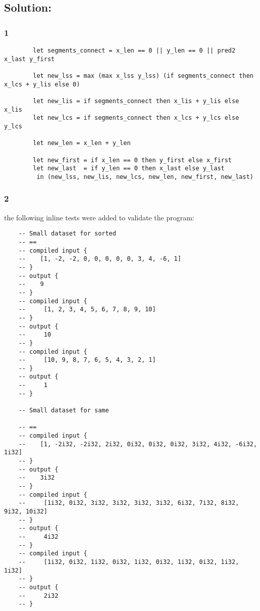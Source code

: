 \documentclass{article}
\begin{document}
\begin{itemize}
    \subsection*{Solution:}

    \subsubsection*{1}
    \begin{lstlisting}
        let segments_connect = x_len == 0 || y_len == 0 || pred2 x_last y_first

        let new_lss = max (max x_lss y_lss) (if segments_connect then x_lcs + y_lis else 0)
      
        let new_lis = if segments_connect then x_lis + y_lis else x_lis
        let new_lcs = if segments_connect then x_lcs + y_lcs else y_lcs
      
        let new_len = x_len + y_len
      
        let new_first = if x_len == 0 then y_first else x_first
        let new_last  = if y_len == 0 then x_last else y_last
         in (new_lss, new_lis, new_lcs, new_len, new_first, new_last)
    \end{lstlisting}

    \subsubsection*{2}
    the following inline tests were added to validate the program:
    \begin{lstlisting}
    -- Small dataset for sorted
    -- ==
    -- compiled input {
    --    [1, -2, -2, 0, 0, 0, 0, 0, 3, 4, -6, 1]
    -- }  
    -- output { 
    --    9
    -- }
    -- compiled input {
    --     [1, 2, 3, 4, 5, 6, 7, 8, 9, 10]
    -- }
    -- output {
    --     10
    -- }
    -- compiled input {
    --     [10, 9, 8, 7, 6, 5, 4, 3, 2, 1]
    -- }
    -- output {
    --     1
    -- }

    -- Small dataset for same

    -- ==
    -- compiled input {
    --    [1, -2i32, -2i32, 2i32, 0i32, 0i32, 0i32, 3i32, 4i32, -6i32, 1i32]
    -- }
    -- output {
    --    3i32
    -- }
    -- compiled input {
    --     [1i32, 0i32, 3i32, 3i32, 3i32, 3i32, 6i32, 7i32, 8i32, 9i32, 10i32]
    -- }
    -- output {
    --     4i32
    -- }
    -- compiled input {
    --     [1i32, 0i32, 1i32, 0i32, 1i32, 0i32, 1i32, 0i32, 1i32, 1i32]
    -- }
    -- output {
    --     2i32
    -- }


\end{lstlisting}
\end{itemize}
\end{document}
